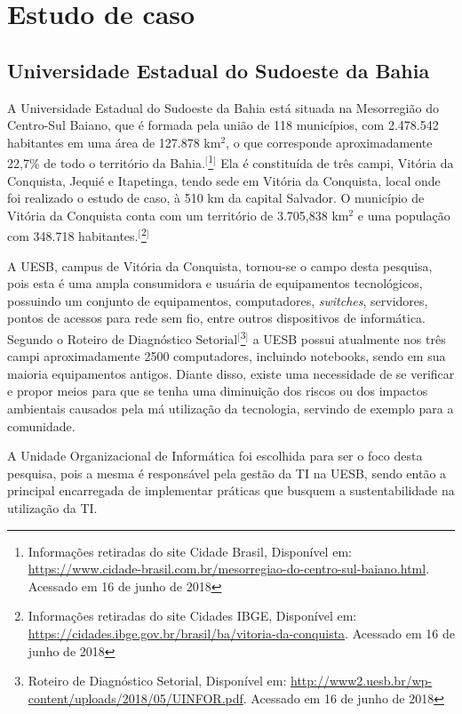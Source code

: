 
\chapter{Estudo de caso}\label{chap:estudodecaso}

\section{Universidade Estadual do Sudoeste da Bahia}

A Universidade Estadual do Sudoeste da Bahia está situada na Mesorregião do Centro-Sul Baiano, que é formada pela união de 118 municípios, com 2.478.542 habitantes em uma área de 127.878 km$^{2}$, o que corresponde aproximadamente 22,7\% de todo o território da Bahia.$^{[}$\footnote{Informações retiradas do site Cidade Brasil, Disponível em: \url{https://www.cidade-brasil.com.br/mesorregiao-do-centro-sul-baiano.html}. Acessado em 16 de junho de 2018}$^{]}$ Ela é constituída de três campi, Vitória da Conquista, Jequié e Itapetinga, tendo sede em Vitória da Conquista, local onde foi realizado o estudo de caso, à 510 km da capital Salvador. O município de Vitória da Conquista conta com um território de 3.705,838 km$^{2}$ e uma população com 348.718 habitantes.$^{[}$\footnote{Informações retiradas do site Cidades IBGE, Disponível em: \url{https://cidades.ibge.gov.br/brasil/ba/vitoria-da-conquista}.  Acessado em 16 de junho de 2018}$^{]}$

A UESB, campus de Vitória da Conquista, tornou-se o campo desta pesquisa, pois esta é uma ampla consumidora e usuária de equipamentos tecnológicos, possuindo um conjunto de equipamentos, computadores, \textit{switches}, servidores, pontos de acessos para rede sem fio, entre outros dispositivos de informática. Segundo o Roteiro de Diagnóstico Setorial$^{[}$\footnote{Roteiro de Diagnóstico Setorial, Disponível em: \url{http://www2.uesb.br/wp-content/uploads/2018/05/UINFOR.pdf}.  Acessado em 16 de junho de 2018}$^{]}$ a UESB possui atualmente nos três campi aproximadamente 2500 computadores, incluindo notebooks, sendo em sua maioria equipamentos antigos. Diante disso, existe uma necessidade de se verificar e propor meios para que se tenha uma diminuição dos riscos ou dos impactos ambientais causados pela má utilização da tecnologia, servindo de exemplo para a comunidade.

A Unidade Organizacional de Informática foi escolhida para ser o foco desta pesquisa, pois a mesma é responsável pela gestão da TI na UESB, sendo então a principal encarregada de implementar práticas que busquem a sustentabilidade na utilização da TI. 

